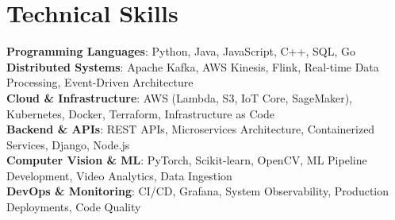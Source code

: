 \documentclass[letterpaper,10pt]{article}
\begin{document}
\section{Technical Skills}
 \begin{itemize}[leftmargin=0.15in, label={}, itemsep=-5pt, topsep=-2pt, parsep=0pt]
    \small{\item{
     \textbf{Programming Languages}{: Python, Java, JavaScript, C++, SQL, Go} \\
     \textbf{Distributed Systems}{: Apache Kafka, AWS Kinesis, Flink, Real-time Data Processing, Event-Driven Architecture} \\
     \textbf{Cloud \& Infrastructure}{: AWS (Lambda, S3, IoT Core, SageMaker), Kubernetes, Docker, Terraform, Infrastructure as Code} \\
     \textbf{Backend \& APIs}{: REST APIs, Microservices Architecture, Containerized Services, Django, Node.js} \\
     \textbf{Computer Vision \& ML}{: PyTorch, Scikit-learn, OpenCV, ML Pipeline Development, Video Analytics, Data Ingestion} \\
     \textbf{DevOps \& Monitoring}{: CI/CD, Grafana, System Observability, Production Deployments, Code Quality}
    }}
 \end{itemize}
\vspace{-12pt}
\end{document}
